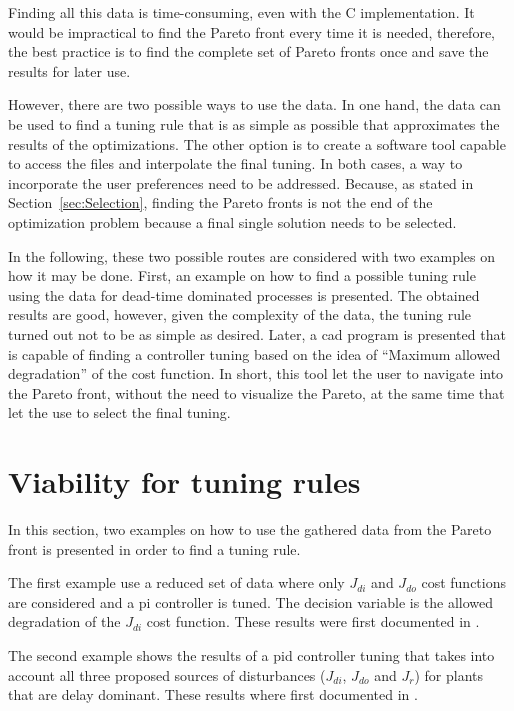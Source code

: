 Finding all this data is time-consuming, even with the C implementation. It would be impractical to find the Pareto front every time it is needed, therefore, the best practice is to find the complete set of Pareto fronts once and save the results for later use.

However, there are two possible ways to use the data. In one hand, the data can be used to find a tuning rule that is as simple as possible that approximates the results of the optimizations. The other option is to create a software tool capable to access the files and interpolate the final tuning. In both cases, a way to incorporate the user preferences need to be addressed. Because, as stated in Section~\ref{sec:Selection}, finding the Pareto fronts is not the end of the optimization problem because a final single solution needs to be selected.

In the following, these two possible routes are considered with two examples on how it may be done. First, an example on how to find a possible tuning rule using the data for dead-time dominated processes is presented. The obtained results are good, however, given the complexity of the data, the tuning rule turned out not to be as simple as desired. Later, a \gls{cad} program is presented that is capable of finding a controller tuning based on the idea of ``Maximum allowed degradation'' of the cost function. In short, this tool let the user to navigate into the Pareto front, without the need to visualize the Pareto, at the same time that let the use to select the final tuning.

\section{Viability for tuning rules}
\label{sec:TuningRulesMOOP}
In this section, two examples on how to use the gathered data from the Pareto front is presented in order to find a tuning rule.

The first example use a reduced set of data where only $J_{di}$ and $J_{do}$ cost functions are considered and a \gls{pi} controller is tuned. The decision variable is the allowed degradation of the $J_{di}$ cost function. These results were first documented in \citet{ContrerasLeiva2015a}. 

The second example shows the results of a \gls{pid} controller tuning that takes into account all three proposed sources of disturbances ($J_{di}$, $J_{do}$ and $J_r$) for plants that are delay dominant. These results where first documented in \citet{Moya2017}.

